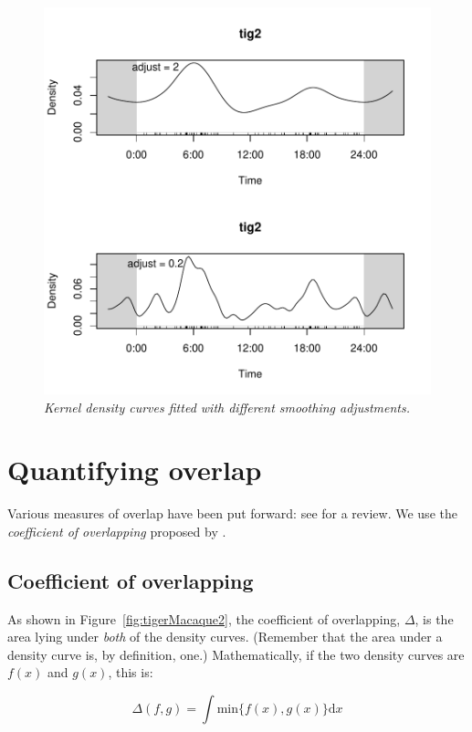 \documentclass[a4paper]{article}
\begin{document}
\begin{figure}[h]
  \centering
  \includegraphics{overlap-smoothing}
  \caption{\it Kernel density curves fitted with different smoothing adjustments.}
  \label{fig:smoothing}
\end{figure}


\section{Quantifying overlap}
\label{sec:quantify}

Various measures of overlap have been put forward: see \citet{RidoutLinkie2009} for a review. We use the \emph{coefficient of overlapping} proposed by \citet{weitzman1970}.

\subsection{Coefficient of overlapping}
\label{subsec:coefficient}


As shown in Figure~\ref{fig:tigerMacaque2}, the coefficient of overlapping, $\Delta$, is the area lying under \emph{both} of the density curves. (Remember that the area under a density curve is, by definition, one.) Mathematically, if the two density curves are $f(x)$ and $g(x)$, this is:

\begin{equation} \label{eq:definition}
  \Delta (f, g) = \int \textrm{min} \{ f(x), g(x) \} \textrm{d}x
\end{equation}
\end{document}

